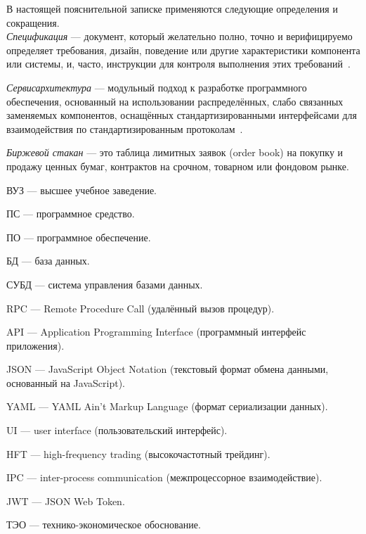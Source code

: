 \label{sec:definitions}
\label{sec:introduction}
\setcounter{page}{6}

В настоящей пояснительной записке применяются следующие определения и сокращения.
\\

\emph{Спецификация} — документ, который желательно полно, точно и верифицируемо определяет требования, дизайн, поведение или другие характеристики компонента или системы, и, часто, инструкции для контроля выполнения этих требований~\cite{istqb_specification}.

\emph{Сервис архитектура} — модульный подход к разработке программного обеспечения, основанный на использовании распределённых, слабо связанных заменяемых компонентов, оснащённых стандартизированными интерфейсами для взаимодействия по стандартизированным протоколам~\cite{wiki_soa}.

\emph{Биржевой стакан} — это таблица лимитных заявок (order book) на покупку и продажу ценных бумаг, контрактов на срочном, товарном или фондовом рынке.

ВУЗ — высшее учебное заведение.

ПС — программное средство.

ПО — программное обеспечение.

БД — база данных.

СУБД — система управления базами данных.

RPC — Remote Procedure Call (удалённый вызов процедур).

API — Application Programming Interface (программный интерфейс приложения).

JSON — JavaScript Object Notation (текстовый формат обмена данными, основанный на JavaScript).

YAML — YAML Ain't Markup Language (формат сериализации данных).

UI — user interface (пользовательский интерфейс).

HFT — high-frequency trading (высокочастотный трейдинг).

IPC — inter-process communication (межпроцессорное взаимодействие).

JWT — JSON Web Token.

ТЭО — технико-экономическое обоснование.

\newpage

